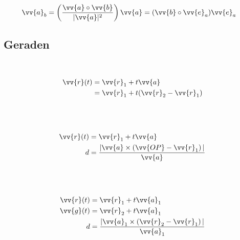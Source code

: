 \begin{boxleft}
\end{boxleft}\begin{boxrightshaded}
\begin{align} 
\vv{a}_b&=\left(\frac{\vv{a}\circ\vv{b}}{|\vv{a}|^2}\right)\vv{a}=(\vv{b}\circ\vv{e}_a)\vv{e}_a
\end{align}\end{boxrightshaded}

\subsection{Geraden}


\begin{boxleft}
\\
\end{boxleft}\begin{boxrightshaded}
\begin{align} 
\vv{r}(t) &=\vv{r}_1+t\vv{a}\\
	  &=\vv{r}_1+t(\vv{r}_2-\vv{r}_1)
\end{align}\end{boxrightshaded}

\begin{boxleft}
\\
\\
\end{boxleft}\begin{boxrightshaded}
\begin{align} 
\vv{r}(t) &=\vv{r}_1+t\vv{a}\\
d&=\frac{|\vv{a}\times\left(\vv{OP}-\vv{r}_1\right)|}{\vv{a}}
\end{align}\end{boxrightshaded}

\begin{boxleft}
\\
\\
\end{boxleft}\begin{boxrightshaded}
\begin{align} 
\vv{r}(t) &=\vv{r}_1+t\vv{a}_1\\
\vv{g}(t) &=\vv{r}_2+t\vv{a}_1\\
d&=\frac{|\vv{a}_1\times\left(\vv{r}_2-\vv{r}_1\right)|}{\vv{a}_1}
\end{align}\end{boxrightshaded}


